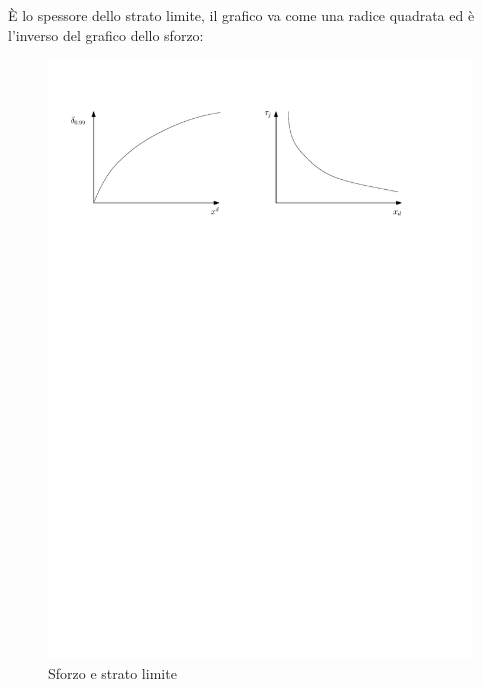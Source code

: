 %
È lo spessore dello strato limite, il grafico va come una radice quadrata ed è l'inverso del grafico dello sforzo: 
%
	\begin{figure}[ht]
		\includegraphics[scale=0.7]{./7.4 Strato limite/7.4-6}
		\centering
		\caption{Sforzo e strato limite}
	\end{figure}
%

